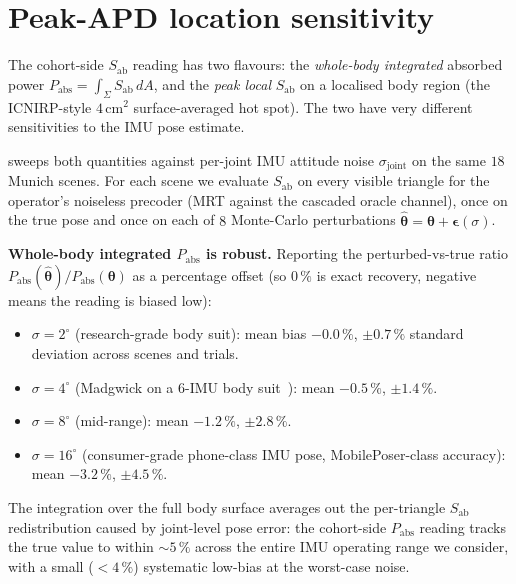 \documentclass[10pt,journal,twocolumn]{IEEEtran}
\theoremstyle{plain}
\theoremstyle{definition}
\begin{document}
\section{Peak-APD location sensitivity}\label{si:peak-apd}

The cohort-side $S_\mathrm{ab}$ reading has two flavours: the
\emph{whole-body integrated} absorbed power $P_\mathrm{abs}
= \int_\Sigma S_\mathrm{ab}\,dA$, and the \emph{peak local} $S_\mathrm{ab}$
on a localised body region (the ICNIRP-style $4\,$cm$^2$
surface-averaged hot spot). The two have very different
sensitivities to the IMU pose estimate.

 sweeps both quantities against per-joint
IMU attitude noise $\sigma_\mathrm{joint}$ on the same $18$
Munich scenes. For each scene we evaluate $S_\mathrm{ab}$ on
every visible triangle for the operator's noiseless precoder
(MRT against the cascaded oracle channel), once on the true
pose and once on each of $8$ Monte-Carlo perturbations
$\hat{\bm{\theta}} = \bm{\theta} + \bm{\epsilon}(\sigma)$.

\textbf{Whole-body integrated $P_\mathrm{abs}$ is robust.}
Reporting the perturbed-vs-true ratio
$P_\mathrm{abs}(\hat{\bm{\theta}}) / P_\mathrm{abs}(\bm{\theta})$
as a percentage offset (so $0\,\%$ is exact recovery, negative
means the reading is biased low):
\begin{itemize}
  \item $\sigma = 2^{\circ}$ (research-grade body suit): mean
    bias $-0.0\,\%$, $\pm 0.7\,\%$ standard deviation across
    scenes and trials.
  \item $\sigma = 4^{\circ}$ (Madgwick on a 6-IMU body
    suit~\cite{Madgwick2011}): mean $-0.5\,\%$, $\pm 1.4\,\%$.
  \item $\sigma = 8^{\circ}$ (mid-range): mean $-1.2\,\%$,
    $\pm 2.8\,\%$.
  \item $\sigma = 16^{\circ}$ (consumer-grade phone-class IMU
    pose, MobilePoser-class accuracy): mean $-3.2\,\%$,
    $\pm 4.5\,\%$.
\end{itemize}
The integration over the full body surface averages out the
per-triangle $S_\mathrm{ab}$ redistribution caused by
joint-level pose error: the cohort-side $P_\mathrm{abs}$
reading tracks the true value to within ${\sim}5\,\%$ across
the entire IMU operating range we consider, with a small
($<4\,\%$) systematic low-bias at the worst-case noise.
\end{document}
